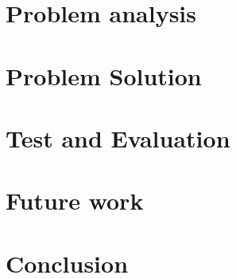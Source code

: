 %
%
%
%
% 


\pagestyle{empty} %



\cleardoublepage
{}
\pagestyle{fancy} %
\setcounter{tocdepth}{1}
\tableofcontents
\listoftodos

\cleardoublepage

\chapter{Problem analysis}






\clearpage

\chapter{Problem Solution}










\chapter{Test and Evaluation}


\chapter{Future work}\label{ch:future-work}

\chapter{Conclusion}

\printbibliography[heading=bibintoc]
\label{bib:mybiblio}
\appendix



